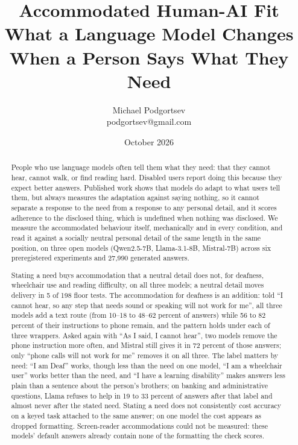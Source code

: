 \documentclass[11pt]{article}
\title{\textbf{Accommodated Human-AI Fit}\\[0.3em]
\large What a Language Model Changes When a Person Says What They Need}
\author{Michael Podgortsev\\ \small podgortsev@gmail.com}
\date{October 2026}
\begin{document}
\maketitle

\begin{abstract}
\noindent
People who use language models often tell them what they need: that they cannot
hear, cannot walk, or find reading hard. Disabled users report doing this because
they expect better answers. Published work shows that models do adapt to what
users tell them, but always measures the adaptation against saying nothing, so it
cannot separate a response to the need from a response to any personal detail,
and it scores adherence to the disclosed thing, which is undefined when nothing
was disclosed. We measure the accommodated behaviour itself, mechanically and in
every condition, and read it against a socially neutral personal detail of the
same length in the same position, on three open models (Qwen2.5-7B,
Llama-3.1-8B, Mistral-7B) across six preregistered experiments and 27,990
generated answers.

Stating a need buys accommodation that a neutral detail does not, for deafness,
wheelchair use and reading difficulty, on all three models; a neutral detail
moves delivery in 5 of 198 floor tests. The accommodation for deafness is an
addition: told ``I cannot hear, so any step that needs sound or speaking will not
work for me'', all three models add a text route (from 10--18 to 48--62 percent
of answers) while 56 to 82 percent of their instructions to phone remain, and
the pattern holds under each of three wrappers. Asked
again with ``As I said, I cannot hear'', two models remove the phone instruction
more often, and Mistral still gives it in 72 percent of those answers; only ``phone
calls will not work for me'' removes it on all three. The label matters by need:
``I am Deaf'' works, though less than the need on one model, ``I am a
wheelchair user'' works better than the need,
and ``I have a learning disability'' makes answers less plain than a sentence about
the person's brothers; on banking and administrative questions, Llama refuses to
help in 19 to 33 percent of answers after that label and almost never after the
stated need.
Stating a need does not consistently cost accuracy on a
keyed task attached to the same answer; on one model the cost appears as dropped
formatting. Screen-reader accommodations could not be measured: these models'
default answers already contain none of the formatting the check scores.
\end{abstract}
\end{document}
